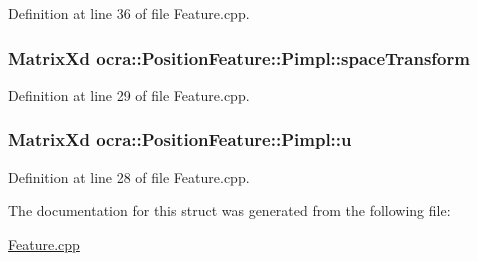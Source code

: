 Definition at line 36 of file Feature.\+cpp.

\subsubsection[{\texorpdfstring{space\+Transform}{spaceTransform}}]{\setlength{\rightskip}{0pt plus 5cm}Matrix\+Xd ocra\+::\+Position\+Feature\+::\+Pimpl\+::space\+Transform}\hypertarget{structocra_1_1PositionFeature_1_1Pimpl_a2e80e58cc94be8c44f8fee3dd030192e}{}\label{structocra_1_1PositionFeature_1_1Pimpl_a2e80e58cc94be8c44f8fee3dd030192e}


Definition at line 29 of file Feature.\+cpp.

\subsubsection[{\texorpdfstring{u}{u}}]{\setlength{\rightskip}{0pt plus 5cm}Matrix\+Xd ocra\+::\+Position\+Feature\+::\+Pimpl\+::u}\hypertarget{structocra_1_1PositionFeature_1_1Pimpl_a5299db1f5f86c7a5808fbf1738ee438a}{}\label{structocra_1_1PositionFeature_1_1Pimpl_a5299db1f5f86c7a5808fbf1738ee438a}


Definition at line 28 of file Feature.\+cpp.



The documentation for this struct was generated from the following file\+:\begin{DoxyCompactItemize}
\item 
\hyperlink{Feature_8cpp}{Feature.\+cpp}\end{DoxyCompactItemize}
